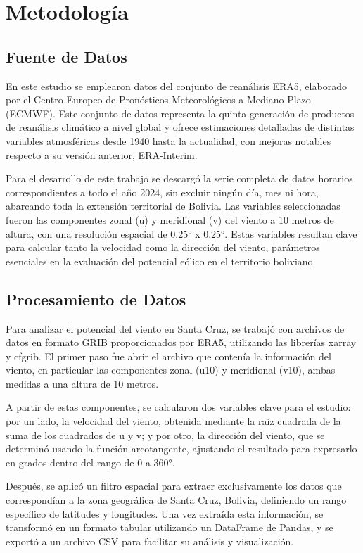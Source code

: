 \documentclass[a4paper,12pt]{article}
\begin{document}
	\section{Metodología}
		\subsection{Fuente de Datos}
		
			En este estudio se emplearon datos del conjunto de reanálisis ERA5, elaborado por el Centro Europeo de Pronósticos Meteorológicos a Mediano Plazo (ECMWF). Este conjunto de datos representa la quinta generación de productos de reanálisis climático a nivel global y ofrece estimaciones detalladas de distintas variables atmosféricas desde 1940 hasta la actualidad, con mejoras notables respecto a su versión anterior, ERA-Interim.
			
			Para el desarrollo de este trabajo se descargó la serie completa de datos horarios correspondientes a todo el año 2024, sin excluir ningún día, mes ni hora, abarcando toda la extensión territorial de Bolivia. Las variables seleccionadas fueron las componentes zonal (u) y meridional (v) del viento a 10 metros de altura, con una resolución espacial de 0.25° x 0.25°. Estas variables resultan clave para calcular tanto la velocidad como la dirección del viento, parámetros esenciales en la evaluación del potencial eólico en el territorio boliviano.
			
		\subsection{Procesamiento de Datos}
			
			Para analizar el potencial del viento en Santa Cruz, se trabajó con archivos de datos en formato GRIB proporcionados por ERA5, utilizando las librerías xarray y cfgrib. El primer paso fue abrir el archivo que contenía la información del viento, en particular las componentes zonal (u10) y meridional (v10), ambas medidas a una altura de 10 metros.
			
			A partir de estas componentes, se calcularon dos variables clave para el estudio: por un lado, la velocidad del viento, obtenida mediante la raíz cuadrada de la suma de los cuadrados de u y v; y por otro, la dirección del viento, que se determinó usando la función arcotangente, ajustando el resultado para expresarlo en grados dentro del rango de 0 a 360°.
			
			Después, se aplicó un filtro espacial para extraer exclusivamente los datos que correspondían a la zona geográfica de Santa Cruz, Bolivia, definiendo un rango específico de latitudes y longitudes. Una vez extraída esta información, se transformó en un formato tabular utilizando un DataFrame de Pandas, y se exportó a un archivo CSV para facilitar su análisis y visualización.
			
\end{document}
